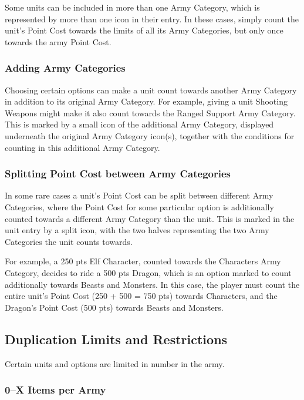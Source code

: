 Some units can be included in more than one Army Category, which is represented by more than one icon in their entry. In these cases, simply count the unit's Point Cost towards the limits of all its Army Categories, but only once towards the army Point Cost.

\subsubsection{Adding Army Categories}

Choosing certain options can make a unit count towards another Army Category in addition to its original Army Category. For example, giving a unit Shooting Weapons might make it also count towards the Ranged Support Army Category. This is marked by a small icon of the additional Army Category, displayed underneath the original Army Category icon(s), together with the conditions for counting in this additional Army Category.

\subsubsection{Splitting Point Cost between Army Categories}

In some rare cases a unit's Point Cost can be split between different Army Categories, where the Point Cost for some particular option is additionally counted towards a different Army Category than the unit. This is marked in the unit entry by a split icon, with the two halves representing the two Army Categories the unit counts towards.

For example, a 250 pts Elf Character, counted towards the Characters Army Category, decides to ride a 500 pts Dragon, which is an option marked to count additionally towards Beasts and Monsters. In this case, the player must count the entire unit's Point Cost (250 + 500 = 750 pts) towards Characters, and the Dragon's Point Cost (500 pts) towards Beasts and Monsters.

\subsection{Duplication Limits and Restrictions}
\label{duplication_limits}

Certain units and options are limited in number in the army.

\subsubsection{0--X Items per Army}

